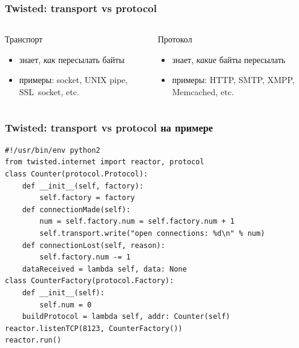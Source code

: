 \documentclass[aspectratio=169]{beamer}
\begin{document}
\begin{frame}
  \frametitle{Twisted: transport vs protocol}
  \begin{columns}
    \begin{column}{.45\textwidth}
      Транспорт
      \begin{itemize}
        \item знает, \emph{как} пересылать байты\par
        \item примеры: socket, UNIX pipe, \mbox{SSL socket}, etc.
      \end{itemize}
    \end{column}
    \begin{column}{.45\textwidth}
      Протокол
      \begin{itemize}
        \item знает, \emph{какие} байты пересылать 
        \item примеры: HTTP, SMTP, XMPP, Memcached, etc.
      \end{itemize}
    \end{column}
  \end{columns}
\end{frame}

\begin{frame}[fragile]
  \frametitle{Twisted: transport vs protocol на примере}
  \begin{lstlisting}
#!/usr/bin/env python2
from twisted.internet import reactor, protocol
class Counter(protocol.Protocol):
    def __init__(self, factory):
        self.factory = factory
    def connectionMade(self):
        num = self.factory.num = self.factory.num + 1 
        self.transport.write("open connections: %d\n" % num)
    def connectionLost(self, reason):
        self.factory.num -= 1
    dataReceived = lambda self, data: None
class CounterFactory(protocol.Factory):
    def __init__(self):
        self.num = 0
    buildProtocol = lambda self, addr: Counter(self)
reactor.listenTCP(8123, CounterFactory())
reactor.run()
  \end{lstlisting}
\end{frame}
\end{document}
